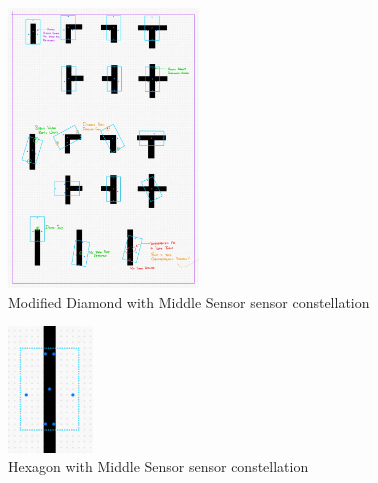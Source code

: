 \documentclass[conference]{IEEEtran}
\begin{document}
\begin{figure}[H]
	\centerline{\includegraphics[width=0.45\textwidth]{constellation-diamond-middle.png}}
	\caption{Modified Diamond with Middle Sensor sensor constellation}
	\label{fig:constellation-diamond-middle}
\end{figure}
\begin{figure}[H]
	\centerline{\includegraphics[width=0.2\textwidth]{constellation-hexagon-middle.png}}
	\caption{Hexagon with Middle Sensor sensor constellation}
	\label{fig:constellation-hexagon-middle}
\end{figure}
\end{document}
